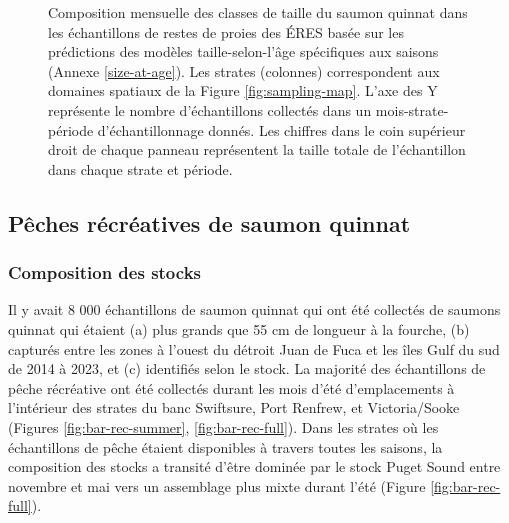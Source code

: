 \begin{figure}[H]
    \centering
    \caption{Composition mensuelle des classes de taille du saumon quinnat dans les échantillons de restes de proies des ÉRES basée sur les prédictions des modèles taille-selon-l'âge spécifiques aux saisons (Annexe \ref{size-at-age}). Les strates (colonnes) correspondent aux domaines spatiaux de la Figure \ref{fig:sampling-map}. L'axe des Y représente le nombre d'échantillons collectés dans un mois-strate-période d'échantillonnage donnés. Les chiffres dans le coin supérieur droit de chaque panneau représentent la taille totale de l'échantillon dans chaque strate et période.}
    \label{fig:bar-size-diet}
\end{figure}

\subsection{Pêches récréatives de saumon quinnat}

\subsubsection{Composition des stocks}

Il y avait 8 000 échantillons de saumon quinnat qui ont été collectés de saumons quinnat qui étaient (a) plus grands que 55 cm de longueur à la fourche, (b) capturés entre les zones à l'ouest du détroit Juan de Fuca et les îles Gulf du sud de 2014 à 2023, et (c) identifiés selon le stock. La majorité des échantillons de pêche récréative ont été collectés durant les mois d'été d'emplacements à l'intérieur des strates du banc Swiftsure, Port Renfrew, et Victoria/Sooke (Figures \ref{fig:bar-rec-summer}, \ref{fig:bar-rec-full}). Dans les strates où les échantillons de pêche étaient disponibles à travers toutes les saisons, la composition des stocks a transité d'être dominée par le stock Puget Sound entre novembre et mai vers un assemblage plus mixte durant l'été (Figure \ref{fig:bar-rec-full}).

